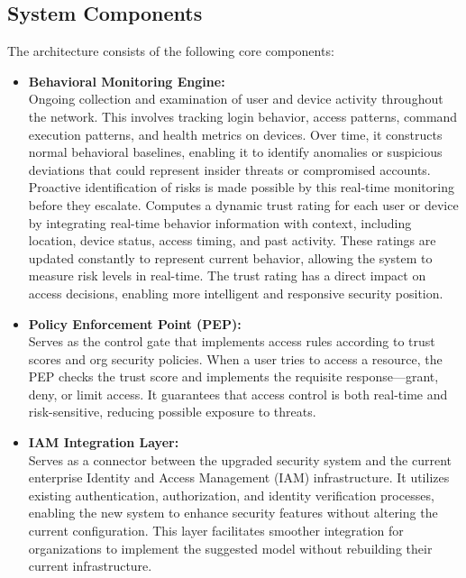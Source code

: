 \documentclass[conference]{IEEEtran}
\begin{document}
\subsection{System Components}
The architecture consists of the following core components:
\begin{itemize}
    \item \textbf{Behavioral Monitoring Engine:} \\ 
    Ongoing collection and examination of user and device activity throughout the network. This involves tracking login behavior, access patterns, command execution patterns, and health metrics on devices. Over time, it constructs normal behavioral baselines, enabling it to identify anomalies or suspicious deviations that could represent insider threats or compromised accounts. Proactive identification of risks is made possible by this real-time monitoring before they escalate.
    Computes a dynamic trust rating for each user or device by integrating real-time behavior information with context, including location, device status, access timing, and past activity. These ratings are updated constantly to represent current behavior, allowing the system to measure risk levels in real-time. The trust rating has a direct impact on access decisions, enabling more intelligent and responsive security position.\cite{paper2,paper6,paper8}

    \item \textbf{Policy Enforcement Point (PEP):} \\ 
    Serves as the control gate that implements access rules according to trust scores and org security policies. When a user tries to access a resource, the PEP checks the trust score and implements the requisite response—grant, deny, or limit access. It guarantees that access control is both real-time and risk-sensitive, reducing possible exposure to threats.\cite{paper2,paper12,paper13}

    \item \textbf{IAM Integration Layer:} \\ 
    Serves as a connector between the upgraded security system and the current enterprise Identity and Access Management (IAM) infrastructure. It utilizes existing authentication, authorization, and identity verification processes, enabling the new system to enhance security features without altering the current configuration. This layer facilitates smoother integration for organizations to implement the suggested model without rebuilding their current infrastructure.\cite{paper12,paper10}
\end{itemize}
\end{document}
